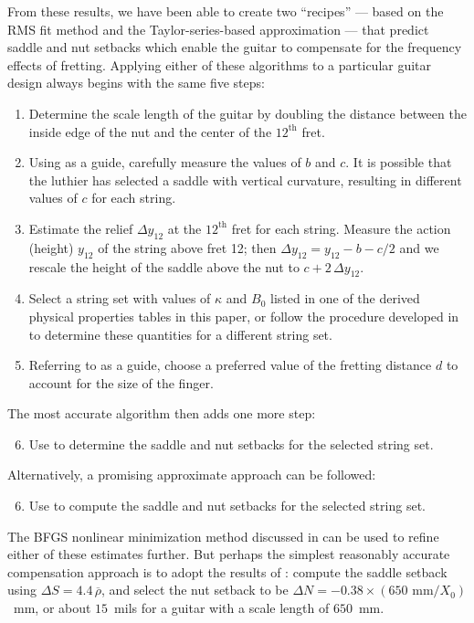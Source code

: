 From these results, we have been able to create two ``recipes'' --- based on the RMS fit method and the Taylor-series-based approximation --- that predict saddle and nut setbacks which enable the guitar to compensate for the frequency effects of fretting. Applying either of these algorithms to a particular guitar design always begins with the same five steps:
\begin{enumerate}
    \item Determine the scale length of the guitar by doubling the distance between the inside edge of the nut and the center of the $12^\textrm{th}$ fret. 
    \item Using  as a guide, carefully measure the values of $b$ and $c$. It is possible that the luthier has selected a saddle with vertical curvature, resulting in different values of $c$ for each string.
    \item Estimate the relief $\Delta y_{12}$ at the $12^\textrm{th}$ fret for each string. Measure the action (height) $y_{12}$ of the string above fret 12; then $\Delta y_{12} = y_{12} - b - c/2$ and we rescale the height of the saddle above the nut to $c + 2\, \Delta y_{12}$.
    \item Select a string set with values of $\kappa$ and $B_0$ listed in one of the derived physical properties tables in this paper, or follow the procedure developed in  to determine these quantities for a different string set.
    \item Referring to  as a guide, choose a preferred value of the fretting distance $d$ to account for the size of the finger.
\end{enumerate}
The most accurate algorithm then adds one more step:
\begin{enumerate}
    \setcounter{enumi}{5}
    \item Use  to determine the saddle and nut setbacks for the selected string set.
\end{enumerate}
Alternatively, a promising approximate approach can be followed:
\begin{enumerate}
    \setcounter{enumi}{5}
    \item Use  to compute the saddle and nut setbacks for the selected string set.
\end{enumerate}
The BFGS nonlinear minimization method discussed in  can be used to refine either of these estimates further. But perhaps the simplest reasonably accurate compensation approach is to adopt the results of : compute the saddle setback using $\Delta S = 4.4\, \overline{\rho}$, and select the nut setback to be $\Delta N = -0.38 \times (650 \textrm{ mm} / X_0)$~mm, or about $15$~mils for a guitar with a scale length of $650$~mm.


